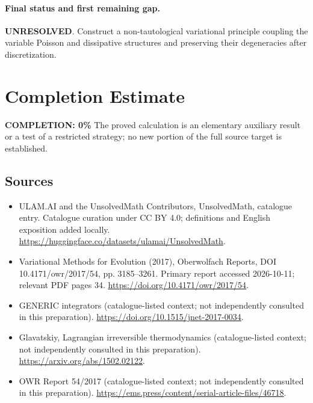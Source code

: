 \documentclass[11pt]{article}
\begin{document}
\paragraph{Final status and first remaining gap.}
\textbf{UNRESOLVED}. Construct a non-tautological variational principle coupling the variable Poisson and dissipative structures and preserving their degeneracies after discretization.

\section{Completion Estimate}
\noindent\textbf{COMPLETION: 0\%}
The proved calculation is an elementary auxiliary result or a test of a restricted strategy; no new portion of the full source target is established.

\subsection{Sources}
\begin{itemize}
\item[\hypertarget{source:statement:1}{S1}] ULAM.AI and the UnsolvedMath Contributors, UnsolvedMath, catalogue entry. Catalogue curation under CC BY 4.0; definitions and English exposition added locally.
\url{https://huggingface.co/datasets/ulamai/UnsolvedMath}.
\item[\hypertarget{source:statement:2}{S2}] Variational Methods for Evolution (2017), Oberwolfach Reports, DOI 10.4171/owr/2017/54, pp. 3185--3261. Primary report accessed 2026-10-11; relevant PDF pages 34.
\url{https://doi.org/10.4171/owr/2017/54}.
\item[\hypertarget{source:statement:3}{S3}] GENERIC integrators (catalogue-listed context; not independently consulted in this preparation).
\url{https://doi.org/10.1515/jnet-2017-0034}.
\item[\hypertarget{source:statement:4}{S4}] Glavatskiy, Lagrangian irreversible thermodynamics (catalogue-listed context; not independently consulted in this preparation).
\url{https://arxiv.org/abs/1502.02122}.
\item[\hypertarget{source:statement:5}{S5}] OWR Report 54/2017 (catalogue-listed context; not independently consulted in this preparation).
\url{https://ems.press/content/serial-article-files/46718}.
\end{itemize}
\label{end:statement}
\end{document}
